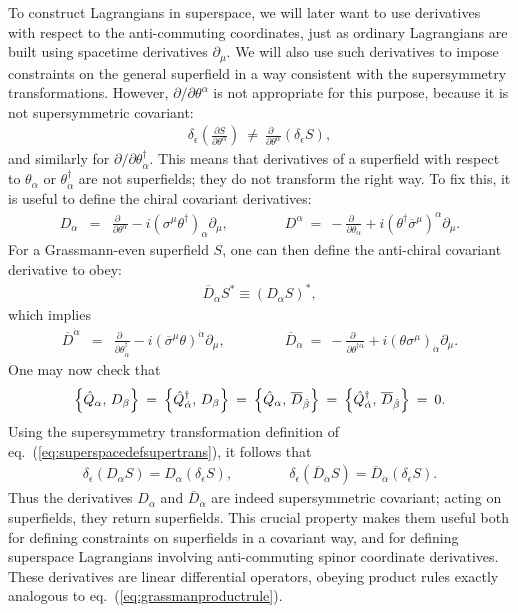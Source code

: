 \documentclass[12pt]{article}
\def\beq{\begin{eqnarray}}
\def\eeq{\end{eqnarray}}
\def\sigmabar{\overline\sigma}
\def\Dcon{\overline D}
\begin{document}
To construct Lagrangians in superspace, we will later want to use 
derivatives with respect to the anti-commuting coordinates, just as 
ordinary Lagrangians are built using spacetime derivatives 
$\partial_\mu$. We will also use such derivatives to impose constraints 
on the general superfield in a way consistent with the supersymmetry 
transformations. However, $
\partial
/
\partial\theta^\alpha
$ is not appropriate for 
this purpose, because it is not supersymmetric covariant:
\beq
\delta_\epsilon \left (\frac{\partial S}{\partial \theta^\alpha} \right )
\>\not=\>
\frac{\partial\phantom{x}}{\partial\theta^\alpha} (\delta_\epsilon S),
\eeq
and similarly for 
$
\partial
/
\partial\theta^\dagger_{\dot\alpha}
$. This means
that derivatives of a superfield with respect to 
$\theta_\alpha$ or $\theta^\dagger_{\dot\alpha}$ are not superfields; they do not transform the right way.
To fix this, it is useful to define the chiral covariant derivatives:
\beq
D_\alpha &=& \frac{\partial\phantom{x}}{\partial\theta^\alpha} 
-i (\sigma^\mu \theta^\dagger)_\alpha \partial_\mu
,
\qquad\qquad
D^\alpha \>=\> -\frac{\partial\phantom{x}}{\partial\theta_\alpha} 
+i (\theta^\dagger \sigmabar^\mu)^\alpha \partial_\mu
.
\eeq
For a Grassmann-even superfield $S$, one can then define the anti-chiral covariant derivative to obey:
\beq
\Dcon_{\dot\alpha} S^* \equiv (D_\alpha S)^*,
\label{eq:defDcon}
\eeq
which implies
\beq
\Dcon^{\dot\alpha} &=& 
\frac{\partial\phantom{x}}{\partial\theta^\dagger_{\dot\alpha}} 
-i (\sigmabar^\mu \theta)^{\dot\alpha} \partial_\mu
,
\qquad\qquad\>
\Dcon_{\dot\alpha} \>=\> 
-\frac{\partial\phantom{x}}{\partial\theta^{\dagger\dot\alpha}} 
+i (\theta \sigma^\mu)_{\dot\alpha} \partial_\mu
.
\eeq
One may now check that
\beq
\Bigl \lbrace \hat Q_\alpha ,\, D_\beta \Bigr \rbrace \>=\>
\Bigl \lbrace \hat Q^\dagger_{\dot\alpha} ,\, D_\beta \Bigr \rbrace \>=\>
\Bigl \lbrace \hat Q_\alpha ,\, \Dcon_{\dot\beta} \Bigr \rbrace \>=\>
\Bigl \lbrace \hat Q^\dagger_{\dot\alpha} ,\, \Dcon_{\dot\beta} 
\Bigr \rbrace \>=\> 0 .
\label{eq:QDanticommute}
\eeq
Using the supersymmetry transformation definition of eq.~(\ref{eq:superspacedefsupertrans}), it follows that
\beq
\delta_\epsilon \left ( D_\alpha S \right )
= D_\alpha\left ( \delta_\epsilon  S \right ),
\qquad
\qquad
\delta_\epsilon \left ( \Dcon_{\dot\alpha} S \right )
= \Dcon_{\dot\alpha} \left ( \delta_\epsilon  S \right )
.
\label{eq:Dsupercon}
\eeq
Thus the derivatives $D_\alpha$ and $\Dcon_{\dot\alpha}$ are indeed 
supersymmetric covariant; acting on superfields, they return superfields. 
This crucial property makes them useful both for defining constraints on superfields in a 
covariant way, and for defining superspace Lagrangians involving 
anti-commuting spinor coordinate derivatives. These derivatives are linear differential operators, obeying product rules
exactly analogous to eq.~(\ref{eq:grassmanproductrule}).
\end{document}
